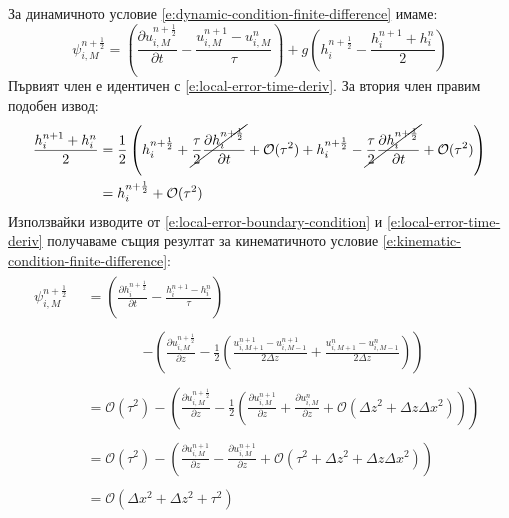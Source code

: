 \documentclass[12pt]{article}
\numberwithin{equation}{section}
\begin{document}
За динамичното условие \autoref{e:dynamic-condition-finite-difference} имаме:
\begin{equation}
    \psi^{n+\frac{1}{2}}_{i,M} = \left( \frac{\partial u^{n+\frac{1}{2}}_{i,M}}{\partial t} - \frac{u^{n+1}_{i,M} - u^n_{i,M}}{\tau} \right) + g\left( h^{n+\frac{1}{2}}_i - \frac{h^{n+1}_i + h^n_i}{2} \right)
\end{equation}
Първият член е идентичен с \autoref{e:local-error-time-deriv}. За втория член правим подобен извод:
\begin{equation}
    \begin{aligned}
        \frac{h^{n+1}_i + h^n_i}{2} &= \frac{1}{2} \left( h^{n+\frac{1}{2}}_i + \cancel{\frac{\tau}{2}\frac{\partial h^{n+\frac{1}{2}}_i}{\partial t}} + \mathcal{O}(\tau^2)
        + h^{n+\frac{1}{2}}_i - \cancel{\frac{\tau}{2}\frac{\partial h^{n+\frac{1}{2}}_i}{\partial t}} + \mathcal{O}(\tau^2) \right) \\
        &= h^{n+\frac{1}{2}}_i + \mathcal{O}(\tau^2)
    \end{aligned}
\end{equation}
Използвайки изводите от \autoref{e:local-error-boundary-condition} и \autoref{e:local-error-time-deriv} получаваме същия резултат за кинематичното условие \autoref{e:kinematic-condition-finite-difference}:
\begin{equation}
    \begin{aligned}
        \psi^{n+\frac{1}{2}}_{i,M} \, &
        \begin{aligned}
            = \left( \frac{\partial h^{n+\frac{1}{2}}_i}{\partial t} - \frac{h^{n+1}_i - h^{n}_i}{\tau} \right)
        \end{aligned}
        \\
        &
        \hspace{4em}
        \begin{aligned}
            - \left( \frac{\partial u^{n+\frac{1}{2}}_{i,M}}{\partial z} - \frac{1}{2}\left(\frac{u^{n+1}_{i,M+1} - u^{n+1}_{i,M-1}}{2\Delta z} + \frac{u^{n}_{i,M+1} - u^{n}_{i,M-1}}{2\Delta z}\right)\right)
        \end{aligned}
        \\
        &
        \begin{aligned}
            = \mathcal{O}(\tau^2) - \left( \frac{\partial u^{n+\frac{1}{2}}_{i,M}}{\partial z} - \frac{1}{2}\left(\frac{\partial u^{n+1}_{i,M}}{\partial z} + \frac{\partial u^{n}_{i,M}}{\partial z} + \mathcal{O}(\Delta z^2 + \Delta z\Delta x^2)\right)\right)
        \end{aligned}
        \\
        &
        \begin{aligned}
            = \mathcal{O}(\tau^2) - \left( \frac{\partial u^{n+1}_{i,M}}{\partial z} - \frac{\partial u^{n+1}_{i,M}}{\partial z} + \mathcal{O}(\tau^2 + \Delta z^2 + \Delta z\Delta x^2)\right)
        \end{aligned}
        \\
        &
        \begin{aligned}
            = \mathcal{O}(\Delta x^2 + \Delta z^2 + \tau^2)
        \end{aligned}
    \end{aligned}
\end{equation}
\end{document}
